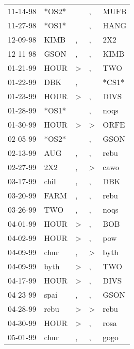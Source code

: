 \begin{supertabular}{lllll}
 11-14-98 &  *OS2* &                  &                , &   MUFB \\
 11-27-98 &  *OS1* &                  &                , &   HANG \\
 12-09-98 &   KIMB &                , &                , &    2X2 \\
 12-11-98 &   GSON &                , &                , &   KIMB \\
 01-21-99 &   HOUR &     \textgreater &                , &    TWO \\
 01-22-99 &    DBK &                , &                  &  *CS1* \\
 01-23-99 &   HOUR &     \textgreater &                , &   DIVS \\
 01-28-99 &  *OS1* &                  &                , &   noqs \\
 01-30-99 &   HOUR &     \textgreater &     \textgreater &   ORFE \\
 02-05-99 &  *OS2* &                  &                , &   GSON \\
 02-13-99 &    AUG &                , &                , &   rebu \\
 02-27-99 &    2X2 &                , &     \textgreater &   cawo \\
 03-17-99 &   chil &                , &                , &    DBK \\
 03-20-99 &   FARM &                , &                , &   rebu \\
 03-26-99 &    TWO &                , &                , &   noqs \\
 04-01-99 &   HOUR &     \textgreater &                , &    BOB \\
 04-02-99 &   HOUR &     \textgreater &                , &    pow \\
 04-09-99 &   chur &                , &     \textgreater &   byth \\
 04-09-99 &   byth &     \textgreater &                , &    TWO \\
 04-17-99 &   HOUR &     \textgreater &                , &   DIVS \\
 04-23-99 &   spai &                , &                , &   GSON \\
 04-28-99 &   rebu &     \textgreater &     \textgreater &   rebu \\
 04-30-99 &   HOUR &     \textgreater &                , &   rosa \\
 05-01-99 &   chur &                , &                , &   gogo \\

\end{supertabular}
